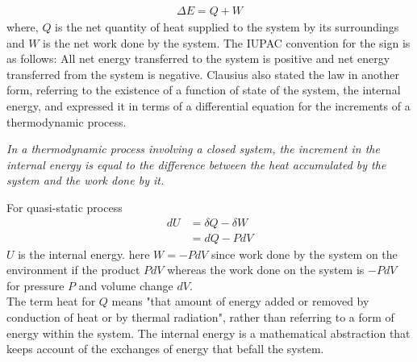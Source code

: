 	\begin{align}
		\Delta E = Q + W
	\end{align}
	where, $Q$ is the net quantity of heat supplied to the system by its surroundings and $W$ is the net work done by the system.
	The IUPAC convention for the sign is as follows: All net energy transferred to the system is positive and net energy transferred from the system is negative.
	Clausius also stated the law in another form, referring to the existence of a function of state of the system, the internal energy, and expressed it in terms of a differential equation for the increments of a thermodynamic process.
	
	\textit{In a thermodynamic process involving a closed system, the increment in the internal energy is equal to the difference between the heat accumulated by the system and the work done by it.}
	
	For quasi-static process
	\begin{align}
		dU &= \delta Q - \delta W \label{def:enternal-energy}\\
		  &= dQ - P dV
	\end{align}
	$U$ is the internal energy.
	here $W = -P dV$
	since work done by the system on the environment if the product $P dV$ whereas the work done on the system is $-P dV$ for pressure $P$ and volume change $dV$.\\
	The term heat for $Q$ means "that  amount of energy added or removed by conduction of heat or by thermal radiation", rather than referring to a form of energy within the system. 
	The internal energy is a mathematical abstraction that keeps account of the exchanges of energy that befall the system.
	
